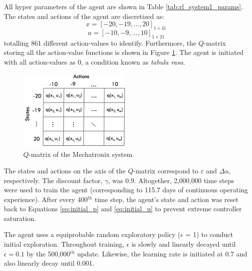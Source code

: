 All hyper parameters of the agent are shown in Table \ref{tab:rl_system1_params}. The states and actions of the agent are discretized as:
\begin{equation}
    x = [-20, -19, ..., 20]_{1 \times 41}
\end{equation}
\begin{equation}
    u = [-10, -9, ..., 10]_{1 \times 21}
\end{equation}
totalling 861 different action-values to identify. Furthermore, the $Q$-matrix storing all the action-value functions is shown in Figure \ref{fig:q_matrix_system1}.  The agent is initiated with all action-values as 0, a condition known as \textit{tabula rasa}.
\begin{figure}[H]
    \centering
    \includegraphics[width=0.5\textwidth]{images/ch4/q_matrix_system1.jpeg}
    \caption{$Q$-matrix of the Mechatronix system.}
    \label{fig:q_matrix_system1}
\end{figure}
The states and actions on the axis of the $Q$-matrix correspond to $\varepsilon$ and $\Delta u$, respectively.  The discount factor, $\gamma$, was 0.9. Altogether, 2,000,000 time steps were used to train the agent (corresponding to 115.7 days of continuous operating experience). After every 400$^{th}$ time step, the agent's state and action was reset back to Equations \ref{eq:initial_p} and \ref{eq:initial_u} to prevent extreme controller saturation. 

The agent uses a equiprobable random exploratory policy ($\epsilon$ = 1) to conduct initial exploration. Throughout training, $\epsilon$ is slowly and linearly decayed until $\epsilon = 0.1$ by the 500,000$^{th}$ update. Likewise, the learning rate is initiated at 0.7 and also linearly decay until 0.001.

